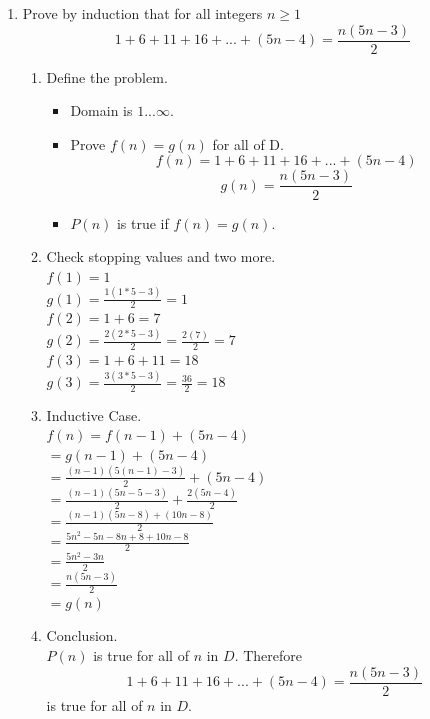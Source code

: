 \documentclass{article}
\begin{document}
\begin{enumerate}
\begin{enumerate}[1.]
    \end{enumerate}
    
    \clearpage
    \item Prove by induction that for all integers $n \geq 1$
    $$1 + 6 + 11 + 16 + ... + (5n - 4) = \frac{n(5n - 3)}{2}$$
    \begin{enumerate}[1.]
        \item Define the problem.
        \begin{itemize}
            \item Domain is $1...\infty$.
            \item Prove $f(n) = g(n)$ for all of D.
            $$f(n) = 1 + 6 + 11 + 16 + ... + (5n-4)$$
            $$g(n) = \frac{n(5n - 3)}{2}$$
            \item $P(n)$ is true if $f(n) = g(n)$.
        \end{itemize}

        \item Check stopping values and two more.\\
        $f(1) = 1$\\
        $g(1) = \frac{1(1*5-3)}{2} = 1$\\
        $f(2) = 1 + 6 = 7$\\
        $g(2) = \frac{2(2*5-3)}{2} = \frac{2(7)}{2} = 7$\\
        $f(3) = 1 + 6 + 11 = 18$\\
        $g(3) = \frac{3(3*5-3)}{2} = \frac{36}{2} = 18$
        \item Inductive Case.\\
            $f(n) = f(n-1) + (5n-4)$\\
            $= g(n-1) + (5n-4)$\\
            $= \frac{(n-1)(5(n-1)-3)}{2} + (5n-4)$\\
            $= \frac{(n-1)(5n-5-3)}{2} + \frac{2(5n-4)}{2}$\\
            $= \frac{(n-1)(5n-8)+(10n-8)}{2}$\\
            $= \frac{5n^{2}-5n-8n+8+10n-8}{2}$\\
            $= \frac{5n^{2}-3n}{2}$\\
            $= \frac{n(5n-3)}{2}$\\
            $= g(n)$

        \item Conclusion.\\
        $P(n)$ is true for all of $n$ in $D$.
        Therefore $$1 + 6 + 11 + 16 + ... + (5n - 4) = \frac{n(5n - 3)}{2}$$ is true for all of $n$ in $D$.
    \end{enumerate}


\end{enumerate}
\end{document}
